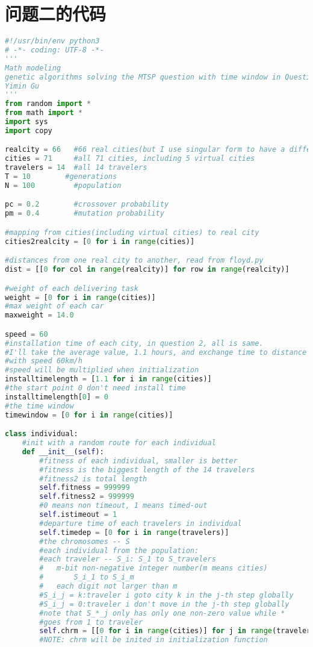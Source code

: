 \documentclass[UTF8,cs4size]{ctexart}
\begin{document}
\section{问题二的代码}\label{q2code}
\begin{lstlisting}[language=Python]
#!/usr/bin/env python3
# -*- coding: UTF-8 -*-
'''
Math modeling
genetic algorithms solving the MTSP question with time window in Question 2
Yimin Gu
'''
from random import *
from math import *
import sys
import copy

realcity = 66   #66 real cities(but I use singular form to have a difference)
cities = 71     #all 71 cities, including 5 virtual cities
travelers = 14  #all 14 travelers
T = 10        #generations
N = 100         #population

pc = 0.2        #crossover probability
pm = 0.4        #mutation probability

#mapping from cities(including virtual cities) to real city
cities2realcity = [0 for i in range(cities)]

#distances from one real city to another, read from floyd.py
dist = [[0 for col in range(realcity)] for row in range(realcity)]

#weight of each delivering task
weight = [0 for i in range(cities)]
#max weight of each car
maxweight = 14.0

speed = 60
#installation time of each city, in question 2, all is same.
#I'll take the average value, 1.1 hours, and exchange time to distance
#with speed 60km/h
#speed will be multiplied when initialization
installtimelength = [1.1 for i in range(cities)]
#the start point 0 don't need install time
installtimelength[0] = 0
#the time window
timewindow = [0 for i in range(cities)]

class individual:
    #init with a random route for each individual
    def __init__(self):
        #fitness of each individual, smaller is better
        #fitness is the biggest length of the 14 travelers
        #fitness2 is total length
        self.fitness = 999999
        self.fitness2 = 999999
        #0 means non timeout, 1 means timed-out
        self.istimeout = 1
        #departure time of each travelers in individual
        self.timedep = [0 for i in range(travelers)]
        #the chromosomes -- S
        #each individual from the population:
        #each traveler -- S_i: S_1 to S_travelers
        #   m-bit non-negative integer number(m means cities)
        #       S_i_1 to S_i_m
        #   each digit not larger than m
        #S_i_j = k:traveler i goto city k in the j-th step globally
        #S_i_j = 0:traveler i don't move in the j-th step globally
        #note that S_*_j only has only one non-zero value while *
        #goes from 1 to traveler
        self.chrm = [[0 for i in range(cities)] for j in range(travelers)] 
        #NOTE: chrm will be inited in initialization function


\end{lstlisting}
\end{document}
